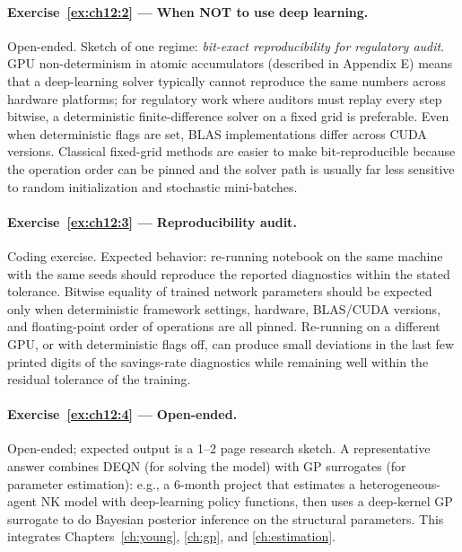 \documentclass[11pt,a4paper]{report}
\begin{document}
\paragraph{Exercise~\ref{ex:ch12:2} --- When NOT to use deep learning.}
Open-ended.  Sketch of one regime: \emph{bit-exact reproducibility for regulatory audit}.  GPU non-determinism in atomic accumulators (described in Appendix E) means that a deep-learning solver typically cannot reproduce the same numbers across hardware platforms; for regulatory work where auditors must replay every step bitwise, a deterministic finite-difference solver on a fixed grid is preferable.  Even when deterministic flags are set, BLAS implementations differ across CUDA versions.  Classical fixed-grid methods are easier to make bit-reproducible because the operation order can be pinned and the solver path is usually far less sensitive to random initialization and stochastic mini-batches.

\paragraph{Exercise~\ref{ex:ch12:3} --- Reproducibility audit.}
Coding exercise.  Expected behavior: re-running notebook  on the same machine with the same seeds should reproduce the reported diagnostics within the stated tolerance.  Bitwise equality of trained network parameters should be expected only when deterministic framework settings, hardware, BLAS/CUDA versions, and floating-point order of operations are all pinned.  Re-running on a different GPU, or with deterministic flags off, can produce small deviations in the last few printed digits of the savings-rate diagnostics while remaining well within the residual tolerance of the training.

\paragraph{Exercise~\ref{ex:ch12:4} --- Open-ended.}
Open-ended; expected output is a 1--2 page research sketch.  A representative answer combines DEQN (for solving the model) with GP surrogates (for parameter estimation): e.g., a 6-month project that estimates a heterogeneous-agent NK model with deep-learning policy functions, then uses a deep-kernel GP surrogate to do Bayesian posterior inference on the structural parameters.  This integrates Chapters~\ref{ch:young}, \ref{ch:gp}, and \ref{ch:estimation}.
\end{document}
